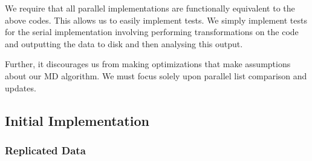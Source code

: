 We require that all parallel implementations are functionally equivalent
to the above codes.
%
This allows us to easily implement tests.
%
We simply implement tests for the serial implementation involving
performing transformations on the code and outputting the data to disk
and then analysing this output.

Further, it discourages us from making optimizations that make
assumptions about our MD algorithm.
%
We must focus solely upon parallel list comparison and updates.

\subsection{Initial Implementation}

\subsubsection{Replicated Data}



